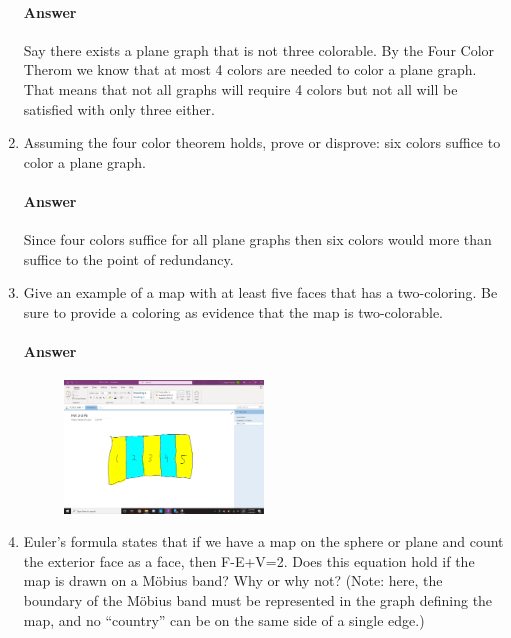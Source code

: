 \documentclass{article}
\begin{document}
\begin{enumerate}
        \paragraph{Answer}
		Say there exists a plane graph that is not three colorable. By the Four Color Therom we know that at most 4 colors are needed to color a plane graph. That means that not all graphs will require 4 colors but not all will be satisfied with only three either.        

    \item Assuming the four color theorem holds, prove or disprove: six colors
        suffice to color a plane graph.

        \paragraph{Answer}
        Since four colors suffice for all plane graphs then six colors would more than suffice to the point of redundancy.

    \item Give an example of a map with at least five faces that has a
        two-coloring.  Be sure to provide a coloring as evidence that the map is
        two-colorable.

        \paragraph{Answer}
        \begin{figure}[h]
			\includegraphics[width=0.5\textwidth]{HW 3-3_6}
		\end{figure}

    \item Euler's formula states that if we have a map on the sphere or plane
        and count the exterior face as a face, then F-E+V=2.  Does this equation
        hold if the map is drawn on a M\"obius band? Why or why not? (Note:
        here, the boundary of the M\"obius band must be represented in the graph
        defining the map, and no ``country'' can be on the same side of a single
        edge.)


\end{enumerate}
\end{document}
